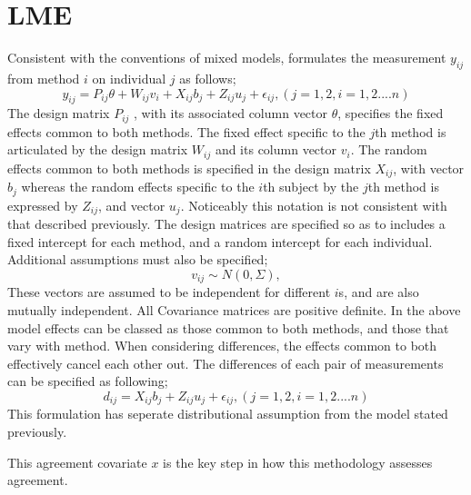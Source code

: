 \documentclass{report}
\begin{document}
\section{LME}
Consistent with the conventions of mixed models, \citet{pkc}
formulates the measurement $y_{ij} $from method $i$ on individual
$j$ as follows;
\begin{equation}
	y_{ij} =P_{ij}\theta + W_{ij}v_{i} + X_{ij}b_{j} + Z_{ij}u_{j} +
	\epsilon_{ij},     (j=1,2, i=1,2....n)
\end{equation}
The design matrix $P_{ij}$ , with its associated column vector
$\theta$, specifies the fixed effects common to both methods. The
fixed effect specific to the $j$th method is articulated by the
design matrix $W_{ij}$ and its column vector $v_{i}$. The random
effects common to both methods is specified in the design matrix
$X_{ij}$, with vector $b_{j}$ whereas the random effects specific
to the $i$th subject by the $j$th method is expressed by $Z_{ij}$,
and vector $u_{j}$. Noticeably this notation is not consistent
with that described previously.  The design matrices are specified
so as to includes a fixed intercept for each method, and a random
intercept for each individual. Additional assumptions must also be
specified;
\begin{equation}
	v_{ij} \sim N(0,\Sigma),
\end{equation}
These vectors are assumed to be independent for different $i$s,
and are also mutually independent. All Covariance matrices are
positive definite.  In the above model effects can be classed as
those common to both methods, and those that vary with method.
When considering differences, the effects common to both
effectively cancel each other out. The differences of each pair of
measurements can be specified as following;
\begin{equation}
	d_{ij} = X_{ij}b_{j} + Z_{ij}u_{j} + \epsilon_{ij},     (j=1,2,
	i=1,2....n)
\end{equation}
This formulation has seperate distributional assumption from the
model stated previously.

This agreement covariate $x$ is the key step in how this
methodology assesses agreement.


\end{document}
